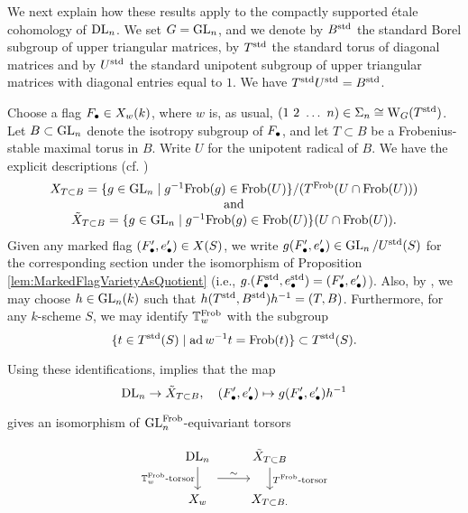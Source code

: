\documentclass[../main.tex]{subfiles}
\begin{document}
We next explain how these results apply to the compactly supported \'etale cohomology
of $\mathrm{DL}_n$. We set $G = \operatorname{GL}_n$, and we denote by $B^{\mathrm{std}}$ the standard Borel
subgroup of upper triangular matrices, by $T^{\mathrm{std}}$ the standard torus of
diagonal matrices
and by $U^{\mathrm{std}}$ the standard unipotent subgroup of upper triangular matrices with
diagonal entries equal to $1$. We have $T^{\mathrm{std}} U^{\mathrm{std}} = B^{\mathrm{std}}$. 

Choose a flag $F_\bullet \in X_w(k)$, where $w$ is, as usual, $(1\ 2\ \dots \ n)
\in \Sigma_n \cong \mathrm W_G(T^{\mathrm{std}})$. Let $B \subset \operatorname{GL}_n$ denote the isotropy
subgroup of $F_\bullet$, and let 
$T \subset B$ be a Frobenius-stable maximal torus in $B$.
Write $U$ for the unipotent radical of $B$.
We have the explicit descriptions (cf. \cite[Definition 1.17]{delignelusztig1976})
\begin{equation} \label{eq:ExplicitDLVarieties}
  \begin{array}c
  X_{T \subset B} = \{g \in \GL_n \mid g^{-1} \Frob(g) \in \Frob(U)\}/(T^\Frob(U \cap \Frob(U)))\\
  \text{and} \\
  \tilde X_{T \subset B} = \{g \in \GL_n \mid g^{-1} \Frob(g) \in \Frob(U)\}(U
  \cap \Frob(U)).
  \end{array}
\end{equation}
Given any marked flag $(F_\bullet', e'_\bullet) \in X(S)$, we write $g(F_\bullet', e'_\bullet) \in
\operatorname{GL}_n/U^{\mathrm{std}}(S)$ for the corresponding
section under the isomorphism of Proposition \ref{lem:MarkedFlagVarietyAsQuotient}
(i.e., $g.(F_\bullet^{\mathrm{std}},e_\bullet^{\mathrm{std}}) = (F_\bullet',e'_\bullet)$). Also, by 
\cite[Proposition 17.13]{milne2017algebraic}, we may
choose $h \in \operatorname{GL}_n(k)$ such that $h(T^{\mathrm{std}}, B^{\mathrm{std}})h^{-1} = (T,B)$. 
Furthermore, for any $k$-scheme $S$, we may identify $\mathbb{T}_w^{\mathrm{Frob}}$ with the subgroup 
\begin{equation*}
  \{t \in T^{\mathrm{std}}(S) \mid \operatorname{ad} w^{-1} t = \mathrm{Frob}(t)\} \subset T^{\mathrm{std}}(S).
\end{equation*}

Using these identifications, \cite[Proposition 1.19]{delignelusztig1976}
implies that the map
\begin{equation*}
\mathrm{DL}_n \to \tilde X_{T \subset B}, \quad (F_\bullet', e'_\bullet) \mapsto g(F_\bullet',
e'_\bullet)h^{-1}
\end{equation*}

gives an isomorphism of $\operatorname{GL}_n^{\mathrm{Frob}}$-equivariant torsors

\begin{equation*}
\begin{tikzcd}[ampersand replacement=\&]
	{\DL_n} \& {\tilde X_{T\subset B}} \\
	{X_w} \& {X_{T \subset B.}}
  \arrow[""{name=0, anchor=center, inner sep=0},
  "{\TT_w^\Frob\text{-torsor}}"', from=1-1, to=2-1]
  \arrow[""{name=1, anchor=center, inner sep=0}, "{T^\Frob\text{-torsor}}",
  from=1-2, to=2-2] \arrow["\sim", shorten <=15pt, shorten >=15pt, from=0, to=1]
\end{tikzcd}
\end{equation*}
\end{document}
